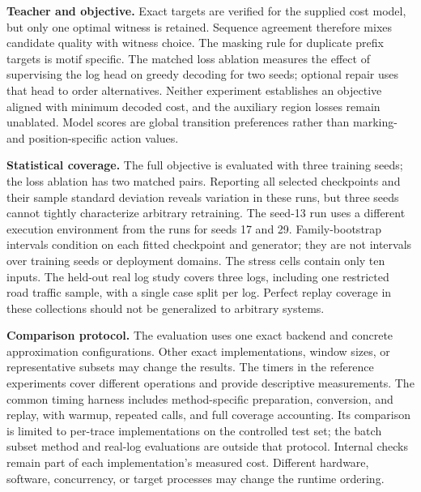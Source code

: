 \begin{revised}\textbf{Teacher and objective.} Exact targets are verified for the supplied cost model, but only one optimal witness is retained. Sequence agreement therefore mixes candidate quality with witness choice. The masking rule for duplicate prefix targets is motif specific. The matched loss ablation measures the effect of supervising the log head on greedy decoding for two seeds; optional repair uses that head to order alternatives. Neither experiment establishes an objective aligned with minimum decoded cost, and the auxiliary region losses remain unablated. Model scores are global transition preferences rather than marking- and position-specific action values.\end{revised}

\begin{revised}\textbf{Statistical coverage.} The full objective is evaluated with three training seeds; the loss ablation has two matched pairs. Reporting all selected checkpoints and their sample standard deviation reveals variation in these runs, but three seeds cannot tightly characterize arbitrary retraining. The seed-13 run uses a different execution environment from the runs for seeds 17 and 29. Family-bootstrap intervals condition on each fitted checkpoint and generator; they are not intervals over training seeds or deployment domains. The stress cells contain only ten inputs. The held-out real log study covers three logs, including one restricted road traffic sample, with a single case split per log. Perfect replay coverage in these collections should not be generalized to arbitrary systems.\end{revised}

\begin{revised}\textbf{Comparison protocol.} The evaluation uses one exact backend and concrete approximation configurations. Other exact implementations, window sizes, or representative subsets may change the results. The timers in the reference experiments cover different operations and provide descriptive measurements. The common timing harness includes method-specific preparation, conversion, and replay, with warmup, repeated calls, and full coverage accounting. Its comparison is limited to per-trace implementations on the controlled test set; the batch subset method and real-log evaluations are outside that protocol. Internal checks remain part of each implementation's measured cost. Different hardware, software, concurrency, or target processes may change the runtime ordering.\end{revised}

